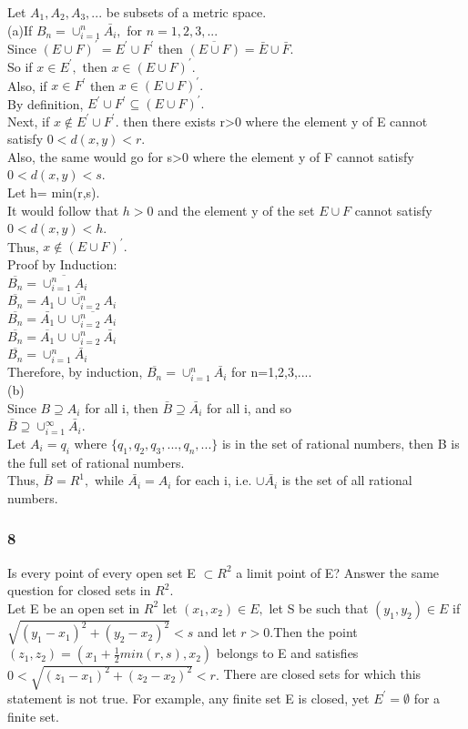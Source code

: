 Let $A_1, A_2, A_3, ...$ be subsets of a metric space. \\
(a)If $B_n= \cup_{i=1}^n \bar{A_i},$ for $n=1,2,3,...$ \\
Since $(E \cup F)^{'}=E^{'} \cup F^{'}$ then $\overline{(E \cup F)}=\bar{E} \cup \bar{F}.$\\ 
So if $x \in E^{'},$ then $x \in (E \cup F)^{'}.$\\
Also, if $x \in F^{'}$ then $x \in (E \cup F)^{'}.$ \\ 
By definition, $E^{'}\cup F^{'} \subseteq (E \cup F)^{'}.$ \\ 
Next, if $x \notin E^{'} \cup F^{'}.$ then there exists r>0 where the element y of E cannot satisfy $0<d(x,y)<r.$\\
Also, the same would go for s>0 where the element y of F cannot satisfy $0<d(x,y)<s.$\\
Let h= min(r,s).\\ 
It would follow that $h>0$ and the element y of the set $E \cup F$ cannot satisfy $0<d(x,y)<h.$\\
Thus, $x \notin (E \cup F)^{'}.$\\
Proof by Induction: \\ 
$\overline{B_n}=\overline{\cup_{i=1}^{n}A_i}$ \\ 
$\overline{B_n}=\overline{A_1 \cup \cup_{i=2}^{n}A_i}$ \\ 
$\overline{B_n}=\bar{A_1} \cup \overline{\cup_{i=2}^{n}A_i}$ \\ 
$\overline{B_n}=\overline{A_1} \cup \cup_{i=2}^{n}\bar{A_i}$ \\ 
$\overline{B_n}=\cup_{i=1}^{n}\bar{A_i}$ \\ 
Therefore, by induction, $\overline{B_n}=\cup_{i=1}^{n}\bar{A_i}$ for
n=1,2,3,....
\\(b)\\
Since $B \supseteq A_{i}$ for all i, then $\bar{B} \supseteq \bar{A_i}$ for all i, and so \\ 
$\bar{B} \supseteq \cup_{i=1}^{\infty}\bar{A_i}$. \\ 
Let $A_i={q_i}$ where $\{q_1, q_2,q_3, ..., q_n,...\}$ is in the set of rational numbers, then B is the full set of rational numbers. \\ 
Thus, $\bar{B}=R^{1},$ while $\bar{A_i}=A_i$ for each i, i.e. $\cup \bar{A_i}$ is the set of all rational numbers. 

\subsubsection*{8}
Is every point of every open set E $\subset R^2$ a limit point of E? Answer the same question for closed sets in $R^2.$ \\
Let E be an open set in $R^2$ let $(x_1,x_2) \in E,$ let S be such that $(y_1,y_2) \in E$ if $\sqrt{(y_1-x_1)^2 +(y_2-x_2)^2}<s$ and let $r>0.$Then the point $(z_1,z_2)=(x_1 +\frac{1}{2} min (r,s), x_2)$ belongs to E and satisfies $0<\sqrt{(z_1-x_1)^2+(z_2-x_2)^2}<r.$ 
There are closed sets for which this statement is not true. For example, any finite set E is closed, yet $E^{'}=\emptyset$ for a finite set.  
